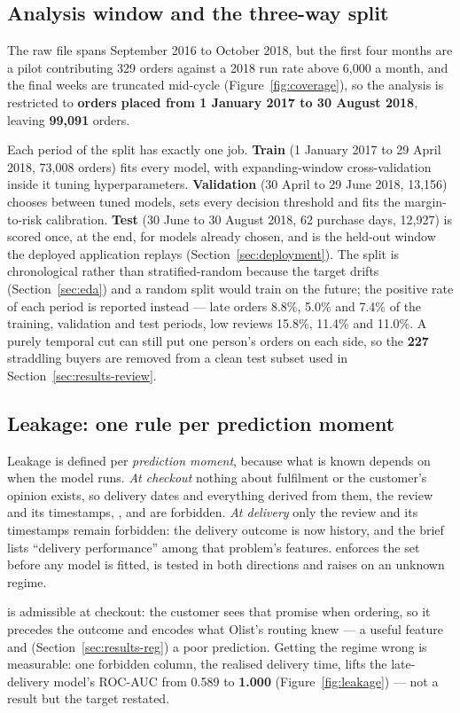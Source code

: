 \subsection{Analysis window and the three-way split}
\label{sec:split}

The raw file spans September 2016 to October 2018, but the first four months
are a pilot contributing 329 orders against a 2018 run rate above 6{,}000 a
month, and the final weeks are truncated mid-cycle
(Figure~\ref{fig:coverage}), so the analysis is restricted to \textbf{orders
placed from 1 January 2017 to 30 August 2018}, leaving \textbf{99{,}091} orders.

Each period of the split has exactly one job. \textbf{Train} (1 January 2017 to
29 April 2018, 73{,}008 orders) fits every model, with expanding-window
cross-validation inside it tuning hyperparameters. \textbf{Validation}
(30 April to 29 June 2018, 13{,}156) chooses between tuned models, sets every
decision threshold and fits the margin-to-risk calibration. \textbf{Test}
(30 June to 30 August 2018, 62 purchase days, 12{,}927) is scored once, at the
end, for models already chosen, and is the held-out window the deployed
application replays (Section~\ref{sec:deployment}). The split is chronological rather than
stratified-random because the target drifts (Section~\ref{sec:eda}) and a
random split would train on the future; the positive rate of each period is
reported instead --- late orders 8.8\%, 5.0\% and 7.4\% of the training,
validation and test periods, low reviews 15.8\%, 11.4\% and 11.0\%. A purely
temporal cut can still put one person's orders on each side, so the \textbf{227} straddling buyers are removed
from a clean test subset used in Section~\ref{sec:results-review}.

\subsection{Leakage: one rule per prediction moment}
\label{sec:leakage}

Leakage is defined per \emph{prediction moment}, because what is known depends
on when the model runs. \emph{At checkout} nothing about fulfilment or the
customer's opinion exists, so delivery dates and everything derived from them,
the review and its timestamps, ,
 and  are forbidden. \emph{At
delivery} only the review and its timestamps remain forbidden: the delivery
outcome is now history, and the brief lists ``delivery performance'' among that
problem's features.  enforces the set
before any model is fitted, is tested in both directions and raises on an
unknown regime.

 is admissible at checkout: the customer
sees that promise when ordering, so it precedes the outcome and encodes what
Olist's routing knew --- a useful feature and (Section~\ref{sec:results-reg}) a
poor prediction. Getting the regime wrong is measurable: one forbidden column,
the realised delivery time, lifts the late-delivery model's ROC-AUC from 0.589
to \textbf{1.000} (Figure~\ref{fig:leakage}) --- not a result but the target
restated.
